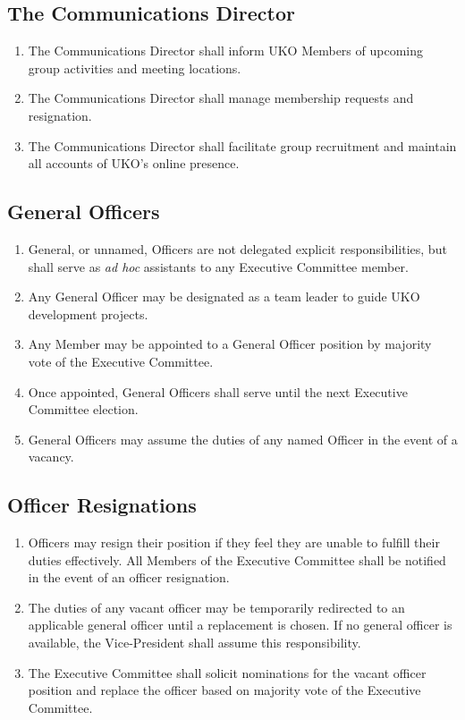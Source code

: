 \documentclass[12pt,executivepaper]{article}
\begin{document}
\subsection{The Communications Director}
\begin{enumerate}
    \item The Communications Director shall inform UKO Members of upcoming group activities
          and meeting locations.
    \item The Communications Director shall manage membership requests and resignation.
    \item The Communications Director shall facilitate group recruitment and maintain all
          accounts of UKO's online presence.
\end{enumerate}

\subsection{General Officers}
\begin{enumerate}
    \item General, or unnamed, Officers are not delegated explicit
          responsibilities, but shall serve as \textit{ad hoc} assistants to
          any Executive Committee member.
    \item Any General Officer may be designated as a team leader to guide UKO
          development projects.
    \item Any Member may be appointed to a General Officer position by majority
          vote of the Executive Committee.
    \item Once appointed, General Officers shall serve until the next Executive
          Committee election.
    \item General Officers may assume the duties of any named Officer in the
          event of a vacancy.
\end{enumerate}

\subsection{Officer Resignations}
\begin{enumerate}
    \item Officers may resign their position if they feel they are unable to
          fulfill their duties effectively. All Members of the Executive
          Committee shall be notified in the event of an officer resignation.
    \item The duties of any vacant officer may be temporarily redirected to
          an applicable general officer until a replacement is chosen. If
          no general officer is available, the Vice-President shall
          assume this responsibility.
    \item The Executive Committee shall solicit nominations for the vacant
          officer position and replace the officer based on majority vote of
          the Executive Committee.
\end{enumerate}
\end{document}
